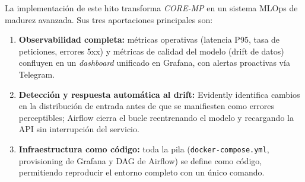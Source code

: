 La implementación de este hito transforma \textit{CORE-MP} en un sistema MLOps de madurez avanzada. Sus tres aportaciones principales son:

\begin{enumerate}
    \item \textbf{Observabilidad completa:} métricas operativas (latencia P95, tasa de peticiones, errores 5xx) y métricas de calidad del modelo (drift de datos) confluyen en un \textit{dashboard} unificado en Grafana, con alertas proactivas vía Telegram.

    \item \textbf{Detección y respuesta automática al drift:} Evidently identifica cambios en la distribución de entrada antes de que se manifiesten como errores perceptibles; Airflow cierra el bucle reentrenando el modelo y recargando la API sin interrupción del servicio.

    \item \textbf{Infraestructura como código:} toda la pila (\texttt{docker-compose.yml}, provisioning de Grafana y DAG de Airflow) se define como código, permitiendo reproducir el entorno completo con un único comando.
\end{enumerate}
